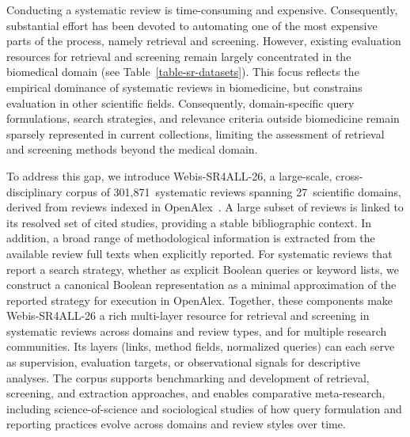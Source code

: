 Conducting a systematic review is time-consuming and expensive. Consequently, substantial effort has been devoted to automating one of the most expensive parts of the process, namely retrieval and screening. However, existing evaluation resources for retrieval and screening remain largely concentrated in the biomedical domain (see Table~\ref{table-sr-datasets}). This focus reflects the empirical dominance of systematic reviews in biomedicine, but constrains evaluation in other scientific fields. Consequently, domain-specific query formulations, search strategies, and relevance criteria outside biomedicine remain sparsely represented in current collections, limiting the assessment of retrieval and screening methods beyond the medical domain.



To address this gap, we introduce Webis-SR4ALL-26, a large-scale, cross-disciplinary corpus of 301,871~systematic reviews spanning 27~scientific domains, derived from reviews indexed in OpenAlex~\cite{Priem2022OpenAlexAF}. A large subset of reviews is linked to its resolved set of cited studies, providing a stable bibliographic context. In addition, a broad range of methodological information is extracted from the available review full texts when explicitly reported. For systematic reviews that report a search strategy, whether as explicit Boolean queries or keyword lists, we construct a canonical Boolean representation as a minimal approximation of the reported strategy for execution in OpenAlex. Together, these components make Webis-SR4ALL-26 a rich multi-layer resource for retrieval and screening in systematic reviews across domains and review types, and for multiple research communities. Its layers (links, method fields, normalized queries) can each serve as supervision, evaluation targets, or observational signals for descriptive analyses. The corpus supports benchmarking and development of retrieval, screening, and extraction approaches, and enables comparative meta-research, including science-of-science and sociological studies of how query formulation and reporting practices evolve across domains and review styles over time.




